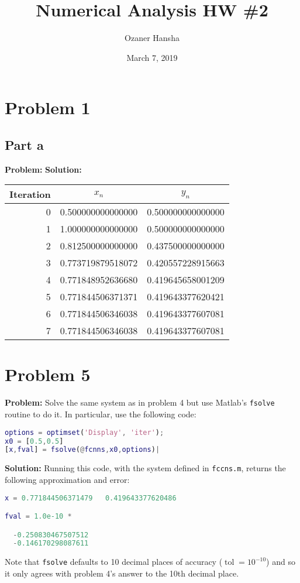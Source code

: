 \documentclass{article}
\begin{document}
\title{Numerical Analysis HW \#2}
\author{Ozaner Hansha}
\date{March 7, 2019}
\maketitle

\section*{Problem 1}
\subsection*{Part a}
\textbf{Problem:}
\textbf{Solution:}

\begin{center}
\begin{tabular}{r|c|c}
      Iteration & $x_n$ & $y_n$\\
      \hline
      0 & 0.500000000000000 & 0.500000000000000\\
      1 & 1.000000000000000 & 0.500000000000000\\
      2 & 0.812500000000000 & 0.437500000000000\\
      3 & 0.773719879518072 & 0.420557228915663\\
      4 & 0.771848952636680 & 0.419645658001209\\
      5 & 0.771844506371371 & 0.419643377620421\\
      6 & 0.771844506346038 & 0.419643377607081\\
      7 & 0.771844506346038 & 0.419643377607081
\end{tabular}
\end{center}


\section*{Problem 5}
\textbf{Problem:} Solve the same system as in problem 4 but use Matlab's \verb|fsolve| routine to do it. In particular, use the following code:

\begin{lstlisting}[language=Matlab]
options = optimset('Display', 'iter');
x0 = [0.5,0.5]
[x,fval] = fsolve(@fcnns,x0,options)|
\end{lstlisting}
\textbf{Solution:}
Running this code, with the system defined in \verb|fccns.m|, returns the following approximation and error:

\begin{lstlisting}[language=Matlab]
x = 0.771844506371479   0.419643377620486

fval = 1.0e-10 *

  -0.250830467507512
  -0.146170298087611
\end{lstlisting}

Note that \verb|fsolve| defaults to 10 decimal places of accuracy ($\operatorname{tol}=10^{-10}$) and so it only agrees with problem 4's answer to the 10th decimal place.
\end{document}
